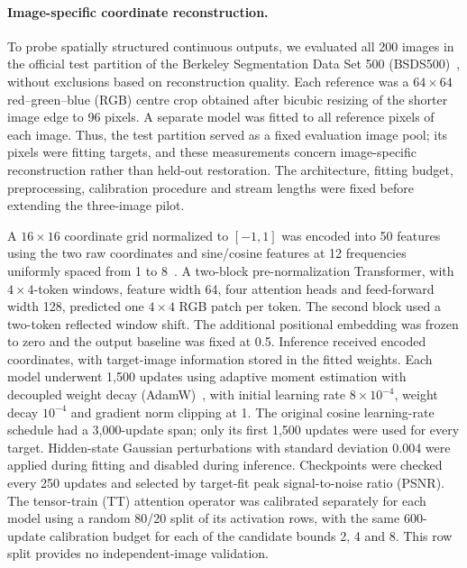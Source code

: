 \documentclass[pdflatex,sn-mathphys-num]{sn-jnl}
\theoremstyle{thmstyleone}
\theoremstyle{thmstyletwo}
\theoremstyle{thmstylethree}
\begin{document}
\paragraph{Image-specific coordinate reconstruction.}
To probe spatially structured continuous outputs, we evaluated all 200 images
in the official test partition of the Berkeley Segmentation Data Set 500
(BSDS500)~\cite{arbelaez2011contour}, without exclusions based on
reconstruction quality. Each reference was a $64\times64$
red--green--blue (RGB) centre crop obtained after bicubic resizing of the
shorter image edge to 96 pixels. A separate model was fitted to all
reference pixels of each image. Thus, the test partition served as a fixed
evaluation image pool; its pixels were fitting targets, and these measurements
concern image-specific reconstruction rather than held-out restoration.
The architecture, fitting budget, preprocessing, calibration procedure and
stream lengths were fixed before extending the three-image pilot.

A $16\times16$ coordinate grid normalized to $[-1,1]$ was encoded into
50 features using the two raw coordinates and sine/cosine features at
12 frequencies uniformly spaced from 1 to 8~\cite{tancik2020fourfeat}.
A two-block pre-normalization Transformer, with $4\times4$-token windows,
feature width 64, four attention heads and feed-forward width 128,
predicted one $4\times4$ RGB patch per token. The second block used a
two-token reflected window shift. The additional positional embedding was
frozen to zero and the output baseline was fixed at 0.5. Inference received
encoded coordinates, with target-image information stored in the fitted weights.
Each model underwent 1,500 updates using adaptive moment estimation with
decoupled weight decay (AdamW)~\cite{loshchilov2019decoupled}, with
initial learning rate $8\times10^{-4}$, weight decay $10^{-4}$ and gradient
norm clipping at 1. The original cosine learning-rate schedule had a
3,000-update span; only its first 1,500 updates were used for every target.
Hidden-state Gaussian perturbations with standard deviation 0.004 were
applied during fitting and disabled during inference. Checkpoints were
checked every 250 updates and selected by target-fit peak signal-to-noise
ratio (PSNR).
The tensor-train (TT) attention operator was calibrated separately for each
model using a random 80/20 split of its activation rows, with the same
600-update calibration budget for each of the candidate bounds 2, 4 and 8.
This row split provides no independent-image validation.
\end{document}
